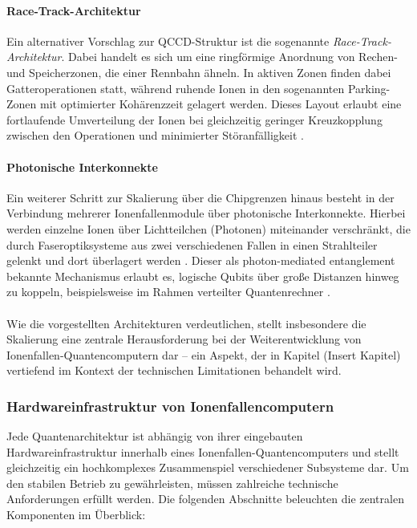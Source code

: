 \medskip

\paragraph{Race-Track-Architektur}

Ein alternativer Vorschlag zur QCCD-Struktur ist die sogenannte \textit{Race-Track-Architektur}. Dabei handelt es sich um eine ringförmige Anordnung von Rechen- und Speicherzonen, die einer Rennbahn ähneln. In aktiven Zonen finden dabei Gatteroperationen statt, während ruhende Ionen in den sogenannten Parking-Zonen mit optimierter Kohärenzzeit gelagert werden. Dieses Layout erlaubt eine fortlaufende Umverteilung der Ionen bei gleichzeitig geringer Kreuzkopplung zwischen den Operationen und minimierter Störanfälligkeit \cite{strohm2024}.

\medskip

\paragraph{Photonische Interkonnekte}

Ein weiterer Schritt zur Skalierung über die Chipgrenzen hinaus besteht in der Verbindung mehrerer Ionenfallenmodule über photonische Interkonnekte. Hierbei werden einzelne Ionen über Lichtteilchen (Photonen) miteinander verschränkt, die durch Faseroptiksysteme aus zwei verschiedenen Fallen in einen Strahlteiler gelenkt und dort überlagert werden \cite{strohm2024}. Dieser als photon-mediated entanglement bekannte Mechanismus erlaubt es, logische Qubits über große Distanzen hinweg zu koppeln, beispielsweise im Rahmen verteilter Quantenrechner \cite{strohm2024}.
\\\\
Wie die vorgestellten Architekturen verdeutlichen, stellt insbesondere die Skalierung eine zentrale Herausforderung bei der Weiterentwicklung von Ionenfallen-Quantencomputern dar – ein Aspekt, der in Kapitel (Insert Kapitel) vertiefend im Kontext der technischen Limitationen behandelt wird.

\subsubsection{Hardwareinfrastruktur von Ionenfallencomputern}
Jede Quantenarchitektur ist abhängig von ihrer eingebauten Hardwareinfrastruktur innerhalb eines Ionenfallen-Quantencomputers und stellt gleichzeitig ein hochkomplexes Zusammenspiel verschiedener Subsysteme dar. Um den stabilen Betrieb zu gewährleisten, müssen zahlreiche technische Anforderungen erfüllt werden. Die folgenden Abschnitte beleuchten die zentralen Komponenten im Überblick: \\

